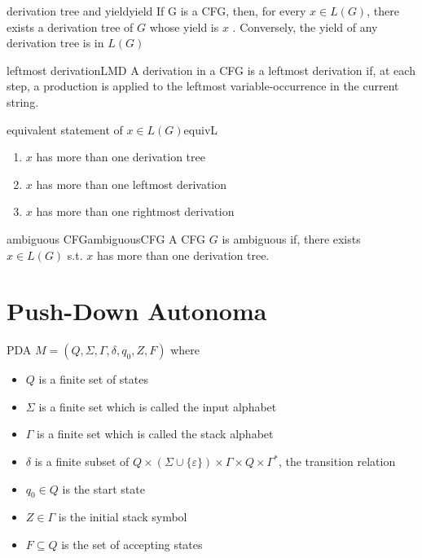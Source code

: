\documentclass[a4paper]{article}
\begin{document}
\begin{Theorem}{derivation tree and yield}{yield}
	If  G  is a CFG, then, for every $x \in L(G)$, there exists a derivation tree of  $G$ whose yield is $x$ . Conversely, the yield of any derivation tree is in  $L(G)$
\end{Theorem}

	\begin{Definition}{leftmost derivation}{LMD}
A derivation in a CFG is a leftmost derivation if, at each step, a production is applied to the leftmost variable-occurrence in the current string.
\end{Definition}

\begin{Theorem}{equivalent statement of $x \in L(G)$}{equivL}
\begin{enumerate}
	\item $x$ has more than one derivation tree
	\item  $x$ has more than one leftmost derivation
	\item  $x$ has more than one rightmost derivation
\end{enumerate}
\end{Theorem}

\begin{Definition}{ambiguous CFG}{ambiguousCFG}
	A CFG $G$ is ambiguous if, there exists  $x \in L(G)$ s.t. $x$ has more than one derivation tree.
\end{Definition}

\newpage
\section{Push-Down Autonoma}

\begin{Definition}{PDA}{}
$M=\left(Q, \Sigma, \Gamma, \delta, q_{0}, Z, F\right)$ where
\begin{itemize}
	\item $Q$ is a finite set of states
	\item $\Sigma$ is a finite set which is called the input alphabet
	\item $\Gamma$ is a finite set which is called the stack alphabet
\item $\delta$ is a finite subset of $Q \times(\Sigma \cup\{\varepsilon\}) \times \Gamma \times Q \times \Gamma^{*}$, the transition relation
\item $q_{0} \in Q$ is the start state
\item $Z \in \Gamma$ is the initial stack symbol
\item  $F \subseteq Q$ is the set of accepting states
\end{itemize}
\end{Definition}
\end{document}
